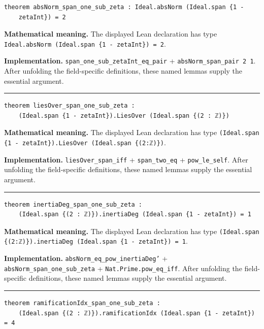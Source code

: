 \documentclass[UTF8,a4paper,11pt,fontset=fandol]{ctexart}
\theoremstyle{definition}
\newcommand{\statementsep}{\par\medskip\hrule\medskip}
\begin{document}
\begin{verbatim}
theorem absNorm_span_one_sub_zeta : Ideal.absNorm (Ideal.span {1 -
    zetaInt}) = 2
\end{verbatim}
\noindent\textbf{Mathematical meaning.} The displayed Lean declaration has type \texttt{Ideal.\allowbreak{}absNorm (Ideal.\allowbreak{}span \{1 - zetaInt\}) = 2}.\par
\noindent\textbf{Implementation.} \texttt{span\_\allowbreak{}one\_\allowbreak{}sub\_\allowbreak{}zetaInt\_\allowbreak{}eq\_\allowbreak{}pair} + \texttt{absNorm\_\allowbreak{}span\_\allowbreak{}pair 2 1}. After unfolding the field-specific definitions, these named lemmas supply the essential argument.\par
\statementsep
\begin{verbatim}
theorem liesOver_span_one_sub_zeta :
    (Ideal.span {1 - zetaInt}).LiesOver (Ideal.span {(2 : ℤ)})
\end{verbatim}
\noindent\textbf{Mathematical meaning.} The displayed Lean declaration has type \texttt{(Ideal.\allowbreak{}span \{1 - zetaInt\}).\allowbreak{}LiesOver (Ideal.\allowbreak{}span \{(2:ℤ)\})}.\par
\noindent\textbf{Implementation.} \texttt{liesOver\_\allowbreak{}span\_\allowbreak{}iff} + \texttt{span\_\allowbreak{}two\_\allowbreak{}eq} + \texttt{pow\_\allowbreak{}le\_\allowbreak{}self}. After unfolding the field-specific definitions, these named lemmas supply the essential argument.\par
\statementsep
\begin{verbatim}
theorem inertiaDeg_span_one_sub_zeta :
    (Ideal.span {(2 : ℤ)}).inertiaDeg (Ideal.span {1 - zetaInt}) = 1
\end{verbatim}
\noindent\textbf{Mathematical meaning.} The displayed Lean declaration has type \texttt{(Ideal.\allowbreak{}span \{(2:ℤ)\}).\allowbreak{}inertiaDeg (Ideal.\allowbreak{}span \{1 - zetaInt\}) = 1}.\par
\noindent\textbf{Implementation.} \texttt{absNorm\_\allowbreak{}eq\_\allowbreak{}pow\_\allowbreak{}inertiaDeg'} + \texttt{absNorm\_\allowbreak{}span\_\allowbreak{}one\_\allowbreak{}sub\_\allowbreak{}zeta} + \texttt{Nat.\allowbreak{}Prime.\allowbreak{}pow\_\allowbreak{}eq\_\allowbreak{}iff}. After unfolding the field-specific definitions, these named lemmas supply the essential argument.\par
\statementsep
\begin{verbatim}
theorem ramificationIdx_span_one_sub_zeta :
    (Ideal.span {(2 : ℤ)}).ramificationIdx (Ideal.span {1 - zetaInt}) = 4
\end{verbatim}
\end{document}
